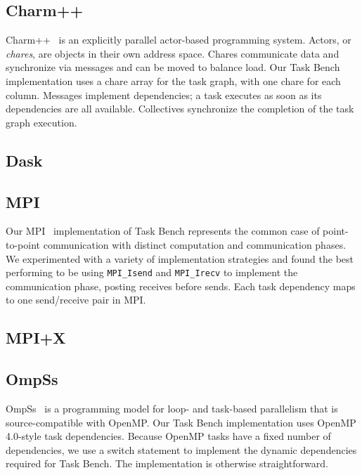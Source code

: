 \subsection{Charm++}

Charm++~\cite{Charmpp93} is an explicitly parallel actor-based programming system. Actors, or
\emph{chares}, are objects in their own address space.
Chares communicate data and synchronize via messages and can be moved
to balance load. Our Task Bench implementation uses a chare
array for the task graph, with one chare for each column. Messages implement dependencies; a task executes as soon as its
dependencies are all available. Collectives synchronize the
completion of the task graph execution.


\subsection{Dask}


\subsection{MPI}

Our MPI~\cite{MPI} implementation of Task Bench represents the common
case of point-to-point communication with distinct computation and
communication phases. We experimented with a variety of implementation
strategies and found the best performing to be using
\lstinline[language=C++]{MPI_Isend} and
\lstinline[language=C++]{MPI_Irecv} to implement the communication
phase, posting receives before sends. Each task dependency maps to one
send/receive pair in MPI.

\subsection{MPI+X}


\subsection{OmpSs}

OmpSs~\cite{OmpSs11} is a programming model for loop- and task-based parallelism
that is source-compatible with OpenMP. Our Task Bench implementation
uses OpenMP 4.0-style task dependencies. Because OpenMP tasks have a fixed number of dependencies, we use a switch
statement to implement the dynamic dependencies required for Task
Bench. The implementation is otherwise straightforward.

